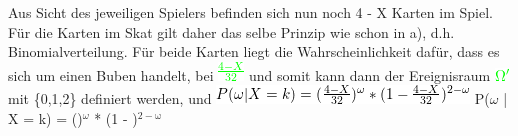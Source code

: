 \documentclass[11pt]{article}
\begin{document}
\begin{itemize}
Aus Sicht des jeweiligen Spielers befinden sich nun noch 4 - X Karten im Spiel. Für die Karten im Skat gilt
daher das selbe Prinzip wie schon in a), d.h. Binomialverteilung.
Für beide Karten liegt die Wahrscheinlichkeit dafür, dass es sich um einen Buben handelt, bei
\includegraphics[width=.9\linewidth]{201212ad-1423041774NqN.png}  und somit kann dann der Ereignisraum \includegraphics[width=.9\linewidth]{201212ad-1424261774a0T.png} mit \{0,1,2\} definiert werden, und 
\includegraphics[width=.9\linewidth]{201301ad-1844013389GFn.png}
P($\omega$ | X = k) = ()$^{\omega}$ * (1 - )$^{\mathrm{2 - \omega}}$



\end{itemize}
\end{document}
